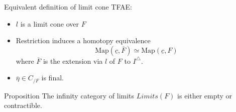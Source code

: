 \begin{proposition}{Equivalent definition of limit cone}{}
    TFAE:\begin{itemize}
        \item $l$ is a limit cone over $F$
        \item Restriction induces a homotopy equivalence $$\mathrm{Map}(\underline{c}, \overline{F})\simeq \mathrm{Map}(\underline{c},F)$$where $\overline{F}$ is the extension via $l$ of $F$ to $I^\triangle$.
        \item $\overline{\eta}\in C_{/F}$ is final.
    \end{itemize}
    
\end{proposition}

\begin{proposition}{Proposition}{}
    The infinity category of limits $Limits(F)$ is either empty or contractible.
    
\end{proposition}
